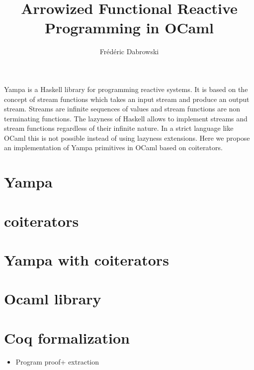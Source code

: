 \documentclass[acmsmall,screen,review,nonacm]{acmart} %
\title{Arrowized Functional Reactive Programming in OCaml}
\author{Frédéric Dabrowski}
\affiliation{%
  \institution{Université d’Orléans, INSA CVL, LIFO, UR 4022}
  \city{Orléans}
  \country{France}
}
\begin{document}
\maketitle
Yampa is a Haskell library for programming reactive systems. It is based
on the concept of stream functions which takes an input stream and produce an output stream.
Streams are infinite sequences of values and stream functions are non terminating functions.
The lazyness of Haskell allows to implement streams and stream functions regardless of their 
infinite nature. 
In a strict language like OCaml this is not possible instead of using lazyness extensions.
Here we propose an implementation of Yampa primitives in OCaml based on coiterators.

\section{Yampa}


\section{coiterators}


\section{Yampa with coiterators}


\section{Ocaml library}

\section{Coq formalization}

\begin{itemize}
    \item Program proof+ extraction
    \end{itemize}
\end{document}
